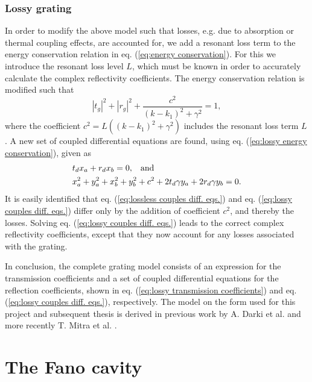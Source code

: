 \subsubsection{Lossy grating}

In order to modify the above model such that losses, e.g. due to absorption or thermal coupling effects, are accounted for, we add a resonant loss term to the energy conservation relation in eq. (\ref{eq:energy conservation}). For this we introduce the resonant loss level $L$, which must be known in order to accurately calculate the complex reflectivity coefficients. The energy conservation relation is modified such that
\begin{equation}
    |t_g|^2 + |r_g|^2 + \frac{c^2}{(k - k_1)^2 + \gamma^2} = 1,
    \label{eq:lossy energy conservation}
\end{equation}
where the coefficient $c^2 = L((k-k_1)^2 + \gamma^2)$ includes the resonant loss term $L$. A new set of coupled differential equations are found, using eq. (\ref{eq:lossy energy conservation}), given as
\begin{equation}
    \begin{split}
        &t_d x_a + r_d x_b = 0, \hspace{0.3cm} \text{and} \\
        &x_a^2 + y_a^2 + x_b^2 + y_b^2 + c^2 +  2 t_d \gamma y_a + 2 r_d \gamma y_b = 0.
    \end{split}
    \label{eq:lossy couples diff. eqs.}
\end{equation}
It is easily identified that eq. (\ref{eq:lossless couples diff. eqs.}) and eq. (\ref{eq:lossy couples diff. eqs.}) differ only by the addition of coefficient $c^2$, and thereby the losses. Solving eq. (\ref{eq:lossy couples diff. eqs.}) leads to the correct complex reflectivity coefficients, except that they now account for any losses associated with the grating. 

In conclusion, the complete grating model consists of an expression for the transmission coefficients and a set of coupled differential equations for the reflection coefficients, shown in eq. (\ref{eq:lossy transmission coefficients}) and eq. (\ref{eq:lossy couples diff. eqs.}), respectively. The model on the form used for this project and subsequent thesis is derived in previous work by A. Darki et al. \cite{Darki} and more recently T. Mitra et al. \cite{Mitra}.

\newpage
\section{The Fano cavity}

